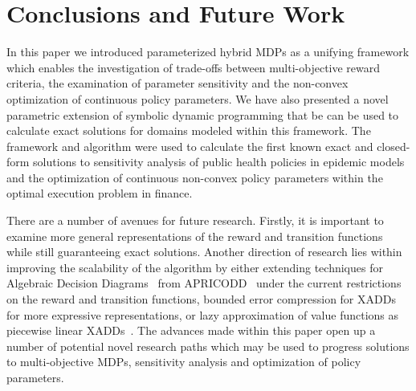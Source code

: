 \section{Conclusions and Future Work}
\label{sec:conclusion}

In this paper we introduced parameterized hybrid MDPs as a unifying framework which enables the investigation of trade-offs between multi-objective reward criteria, the examination of parameter sensitivity and the non-convex optimization of continuous policy parameters. 
We have also presented a novel parametric extension of symbolic dynamic programming that be can be used to calculate exact solutions for domains modeled within this framework. The framework and algorithm were used to calculate the first known exact and closed-form solutions to sensitivity analysis of public health policies in epidemic models and the optimization of continuous non-convex policy parameters within the optimal execution problem in finance.

There are a number of avenues for future research. Firstly, it is important to examine more general representations of the reward and transition functions while still guaranteeing exact solutions. Another direction of research lies within improving the scalability of the algorithm by either extending techniques for Algebraic Decision Diagrams~\parencite{Bahar_JoFMiSD_1993} from APRICODD~\parencite{St-Aubin_NIPS_2000} under the current restrictions on the reward and transition functions, bounded error compression for 
XADDs~\parencite{Vianna_UAI_2013} for more expressive representations, or lazy approximation of value functions as piecewise linear XADDs~\parencite{Li_AAAI_2005}. The advances made within this paper open up a number of potential novel research paths which may be used to progress solutions to multi-objective MDPs, sensitivity analysis and optimization of policy parameters.